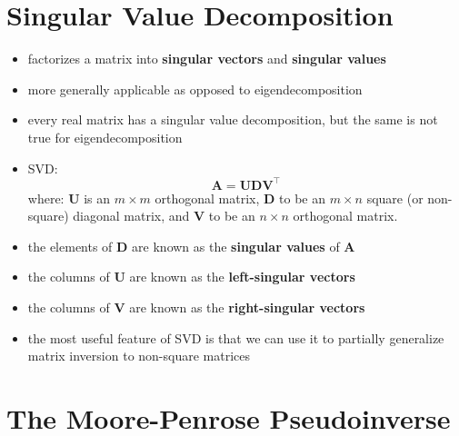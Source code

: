 \documentclass[11pt,twocolumn]{report}
\begin{document}
\section{Singular Value Decomposition}
\begin{itemize}
  \item factorizes a matrix into \textbf{singular vectors} and \textbf{singular
      values}
  \item more generally applicable as opposed to eigendecomposition
  \item every real matrix has a singular value decomposition, but the same is
    not true for eigendecomposition
  \item SVD:
    \begin{equation}
      \bm{A} = \bm{UDV}^\intercal
    \end{equation}
    where: $\bm{U}$ is an $m \times m$ orthogonal matrix, $\bm{D}$ to be an $m
    \times n$ square (or non-square) diagonal matrix, and $\bm{V}$ to be an $n
    \times n$ orthogonal matrix.
  \item the elements of $\bm{D}$ are known as the \textbf{singular values} of
    $\bm{A}$
  \item the columns of $\bm{U}$ are known as the \textbf{left-singular vectors}
  \item the columns of $\bm{V}$ are known as the \textbf{right-singular vectors}
  \item the most useful feature of SVD is that we can use it to partially
    generalize matrix inversion to non-square matrices
\end{itemize}

\section{The Moore-Penrose Pseudoinverse}
\end{document}
